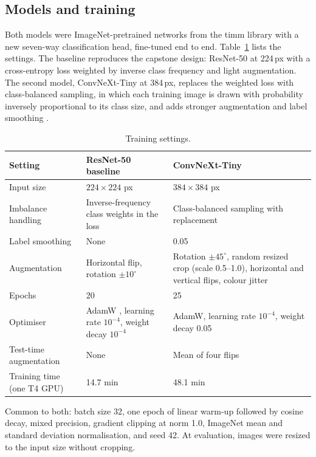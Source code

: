 \documentclass[11pt,a4paper]{article}
\begin{document}
\subsection{Models and training}
Both models were ImageNet-pretrained networks from the timm library \cite{wightman2019} with a new seven-way classification head, fine-tuned end to end. Table~\ref{tab:settings} lists the settings. The baseline reproduces the capstone design: ResNet-50 \cite{he2016} at 224\,px with a cross-entropy loss weighted by inverse class frequency and light augmentation. The second model, ConvNeXt-Tiny \cite{liu2022} at 384\,px, replaces the weighted loss with class-balanced sampling, in which each training image is drawn with probability inversely proportional to its class size, and adds stronger augmentation and label smoothing \cite{szegedy2016}.

\begin{table}[ht]
\centering
\caption{Training settings.}
\label{tab:settings}
\small
\begin{tabularx}{\textwidth}{@{}lXX@{}}
\toprule
Setting & ResNet-50 baseline & ConvNeXt-Tiny \\
\midrule
Input size & $224\times224$ px & $384\times384$ px \\
Imbalance handling & Inverse-frequency class weights in the loss & Class-balanced sampling with replacement \\
Label smoothing & None & 0.05 \\
Augmentation & Horizontal flip, rotation $\pm10^\circ$ & Rotation $\pm45^\circ$, random resized crop (scale 0.5--1.0), horizontal and vertical flips, colour jitter \\
Epochs & 20 & 25 \\
Optimiser & AdamW \cite{loshchilov2019}, learning rate $10^{-4}$, weight decay $10^{-4}$ & AdamW, learning rate $10^{-4}$, weight decay 0.05 \\
Test-time augmentation & None & Mean of four flips \\
Training time (one T4 GPU) & 14.7 min & 48.1 min \\
\bottomrule
\end{tabularx}
\end{table}

Common to both: batch size 32, one epoch of linear warm-up followed by cosine decay, mixed precision, gradient clipping at norm 1.0, ImageNet mean and standard deviation normalisation, and seed 42. At evaluation, images were resized to the input size without cropping.
\end{document}
